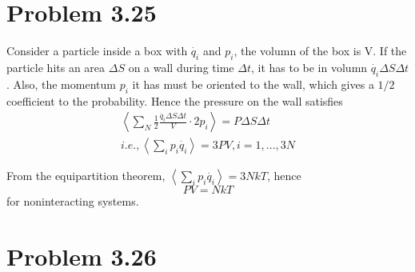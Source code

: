 \documentclass{article}
\begin{document}
\section*{Problem 3.25} %
\label{sec:problem_3_25}
	Consider a particle inside a box with $\dot{q_i} $ and $p_i$, the volumn of the box is V. If the particle hits an area $\Delta S $ on a wall during time $\Delta t $, it has to be in volumn $\dot{q_i} \Delta S \Delta t $. Also, the momentum $p_i$ it has must be oriented to the wall, which gives a $1/2$ coefficient to the probability. Hence the pressure on the wall satisfies
	\begin{gather*}
		\left<\sum_N \frac{1}{2} \frac{\dot{q_i} \Delta S \Delta t }{V} \cdot 2p_i \right> = P \Delta S \Delta t\\
		i.e., \left<\sum_i p_i \dot{q_i} \right> = 3PV, i=1,...,3N
	\end{gather*}

	From the equipartition theorem, $\left<\sum_i p_i \dot{q_i} \right> = 3NkT  $, hence
	\begin{equation*}
		PV=NkT
	\end{equation*}
	for noninteracting systems.

\section*{Problem 3.26}
\end{document}
